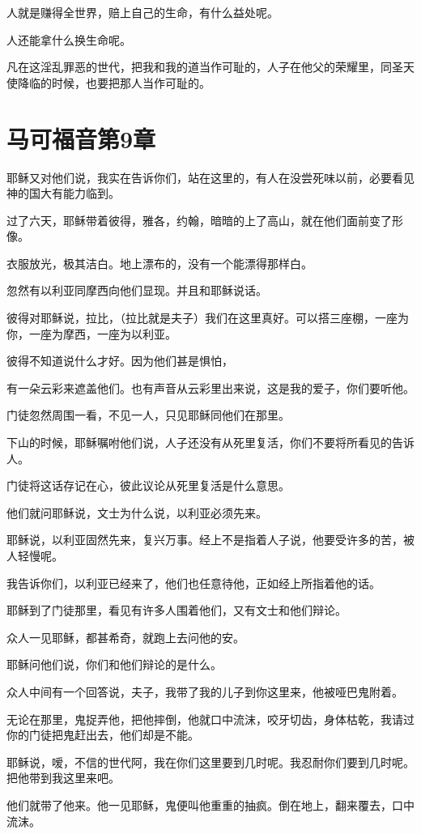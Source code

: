 \documentclass[12pt,oneside]{book}
\begin{document}
人就是赚得全世界，赔上自己的生命，有什么益处呢。

人还能拿什么换生命呢。

凡在这淫乱罪恶的世代，把我和我的道当作可耻的，人子在他父的荣耀里，同圣天使降临的时候，也要把那人当作可耻的。

\chapter{马可福音第9章}
耶稣又对他们说，我实在告诉你们，站在这里的，有人在没尝死味以前，必要看见神的国大有能力临到。

过了六天，耶稣带着彼得，雅各，约翰，暗暗的上了高山，就在他们面前变了形像。

衣服放光，极其洁白。地上漂布的，没有一个能漂得那样白。

忽然有以利亚同摩西向他们显现。并且和耶稣说话。

彼得对耶稣说，拉比，（拉比就是夫子）我们在这里真好。可以搭三座棚，一座为你，一座为摩西，一座为以利亚。

彼得不知道说什么才好。因为他们甚是惧怕，

有一朵云彩来遮盖他们。也有声音从云彩里出来说，这是我的爱子，你们要听他。

门徒忽然周围一看，不见一人，只见耶稣同他们在那里。

下山的时候，耶稣嘱咐他们说，人子还没有从死里复活，你们不要将所看见的告诉人。

门徒将这话存记在心，彼此议论从死里复活是什么意思。

他们就问耶稣说，文士为什么说，以利亚必须先来。

耶稣说，以利亚固然先来，复兴万事。经上不是指着人子说，他要受许多的苦，被人轻慢呢。

我告诉你们，以利亚已经来了，他们也任意待他，正如经上所指着他的话。

耶稣到了门徒那里，看见有许多人围着他们，又有文士和他们辩论。

众人一见耶稣，都甚希奇，就跑上去问他的安。

耶稣问他们说，你们和他们辩论的是什么。

众人中间有一个回答说，夫子，我带了我的儿子到你这里来，他被哑巴鬼附着。

无论在那里，鬼捉弄他，把他摔倒，他就口中流沫，咬牙切齿，身体枯乾，我请过你的门徒把鬼赶出去，他们却是不能。

耶稣说，嗳，不信的世代阿，我在你们这里要到几时呢。我忍耐你们要到几时呢。把他带到我这里来吧。

他们就带了他来。他一见耶稣，鬼便叫他重重的抽疯。倒在地上，翻来覆去，口中流沫。
\end{document}
